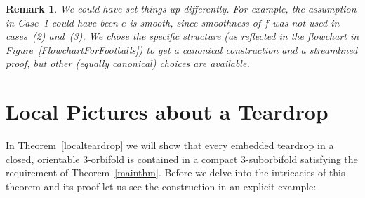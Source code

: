 \documentclass[12pt,reqno]{amsart}
\theoremstyle{plain}
\theoremstyle{definition}
\numberwithin{subcase}{case}
\theoremstyle{plain}
\newtheorem{remark}[thm]{Remark}
\theoremstyle{definition}
\begin{document}
\begin{remark}{\rm
\label{rmk:MoreThanOneCase}
We could have set things up differently. For example, the assumption in Case~1 could have been \em \(e\) is smooth\em, since smoothness of \(f\) was not used in cases~(2) and~(3). We chose the specific structure (as reflected in the flowchart in Figure~\ref{FlowchartForFootballs}) to get a \em canonical \em construction and a streamlined proof, but other (equally canonical) choices are available.
}\end{remark}


\section{Local Pictures about a Teardrop}\label{sec:Local Pictures about a Teardrop}
In Theorem~\ref{localteardrop} we will show that every embedded teardrop in a closed, orientable 3-orbifold is contained in a compact 3-suborbifold satisfying the requirement of Theorem~\ref{mainthm}.  Before we delve into the intricacies of this theorem and its proof let us see the construction in an explicit example: 
\end{document}
